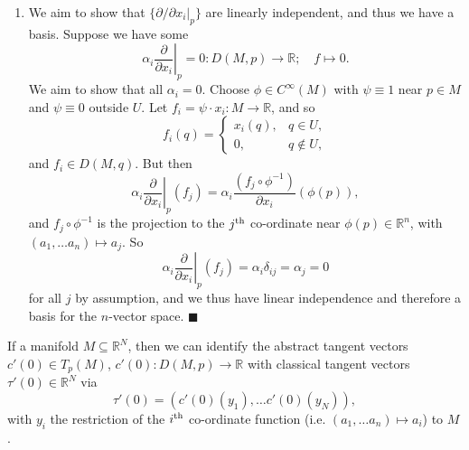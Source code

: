 \documentclass[letter-paper]{tufte-book}
\newenvironment{proof}[1][Proof]{\begin{trivlist}
\item[\hskip \labelsep {\bfseries #1}]}{\end{trivlist}}
\newcommand{\qed}{\hfill$\blacksquare$}
\begin{document}
\begin{proof}
\begin{enumerate}
    \item We aim to show that $\{\left.\partial / \partial x_i\right|_p\}$ are linearly independent, and thus we have a basis. Suppose we have some
    \begin{equation*}
      \alpha_i\left.\frac{\partial}{\partial x_i}\right|_p = 0: D(M,p) \to \mathbb{R};\quad f\mapsto 0.
    \end{equation*}
    We aim to show that all $\alpha_i = 0$. Choose $\phi\in C^\infty(M)$ with $\psi \equiv 1$ near $p\in M$ and $\psi\equiv 0$ outside $U$. Let $f_i = \psi\cdot x_i : M\to \mathbb{R}$, and so
    \begin{equation*}
      f_i(q) = \begin{cases}x_i(q), & q\in U,\\ 0, & q\not\in U,\end{cases}
    \end{equation*}
    and $f_i \in D(M,q)$. But then
    \begin{equation*}
      \alpha_i\left.\frac{\partial}{\partial x_i}\right|_p(f_j) = \alpha_i \frac{(f_j \circ \phi^{-1})}{\partial x_i}(\phi(p)),
    \end{equation*}
    and $f_j \circ \phi^{-1}$ is the projection to the $j^{\tiny\textnormal{th}}$ co-ordinate near $\phi(p) \in  \mathbb{R}^n$, with $(a_1, \ldots a_n) \mapsto a_j$. So
    \begin{equation*}
      \alpha_i\left.\frac{\partial}{\partial x_i}\right|_p(f_j) = \alpha_i \delta_{ij} = \alpha_j = 0
    \end{equation*}
    for all $j$ by assumption, and we thus have linear independence and therefore a basis for the $n$-vector space. \qed
  \end{enumerate}
\end{proof}

If a manifold $M \subseteq \mathbb{R}^N$, then we can identify the abstract tangent vectors $c'(0) \in T_p(M)$, $c'(0) : D(M,p) \to \mathbb{R}$ with classical tangent vectors $\tau'(0) \in \mathbb{R}^N$ via
\begin{equation*}
  \tau'(0) = (c'(0)(y_1), \ldots c'(0)(y_N)),
\end{equation*}
with $y_i$ the restriction of the $i^{\tiny\textnormal{th}}$ co-ordinate function (i.e. $(a_1, \ldots a_n) \mapsto a_i$) to $M$.
\end{document}
